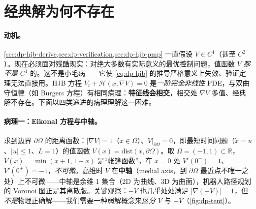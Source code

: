 \section{经典解为何不存在}
\label{sec:dp-noclassical}

\paragraph{动机。}
\cref{sec:dp-hjb-derive,sec:dp-verification,sec:dp-hjb-pmp} 一直假设 $V\in C^1$（甚至 $C^2$）。现在必须面对残酷现实：对绝大多数有实际意义的最优控制问题，值函数 $V$ \emph{都不是} $C^1$ 的。这不是小毛病——它使 \cref{eq:dp-hjb} 的推导严格意义上失效、验证定理无法直接用。HJB 方程 $V_t+\mathcal H(x,\nabla V)=0$ 是\emph{一阶完全非线性} PDE，与双曲守恒律（如 Burgers 方程）有相同病理：\textbf{特征线会相交}，相交处 $\nabla V$ 多值、经典解不存在。下面以四类递进的病理理解这一困难。

\paragraph{病理一：Eikonal 方程与中轴。}求到边界 $\partial\Omega$ 的距离函数：$|\nabla V|=1$（$x\in\Omega$）、$V|_{\partial\Omega}=0$，即最短时间问题（$\dot x=u$、$|u|\le1$、$L=1$）的值函数 $V(x)=\mathrm{dist}(x,\partial\Omega)$。取 $\Omega=(-1,1)\subset\mathbb R$，$V(x)=\min(x+1,1-x)$ 是“帐篷函数”，在 $x=0$ 处 $V'(0^-)=1$、$V'(0^+)=-1$，\emph{不可微}。高维时 $V$ 在\textbf{中轴}（medial axis，到 $\partial\Omega$ 最近点不唯一之处）上不可微——中轴是余维 1 集合（2D 为曲线、3D 为曲面），机器人路径规划的 Voronoi 图正是其离散版。关键观察：$-V$ 也几乎处处满足 $|\nabla(-V)|=1$，但\emph{不是}物理正确解——我们需要一种弱解概念来\emph{区分} $V$ 与 $-V$（\cref{fig:dp-tent}）。


